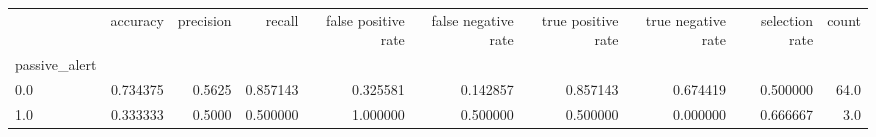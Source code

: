 \begin{tabular}{lrrrrrrrrr}
\toprule
{} &  accuracy &  precision &    recall &  false positive rate &  false negative rate &  true positive rate &  true negative rate &  selection rate &  count \\
passive\_alert &           &            &           &                      &                      &                     &                     &                 &        \\
\midrule
0.0           &  0.734375 &     0.5625 &  0.857143 &             0.325581 &             0.142857 &            0.857143 &            0.674419 &        0.500000 &   64.0 \\
1.0           &  0.333333 &     0.5000 &  0.500000 &             1.000000 &             0.500000 &            0.500000 &            0.000000 &        0.666667 &    3.0 \\
\bottomrule
\end{tabular}
